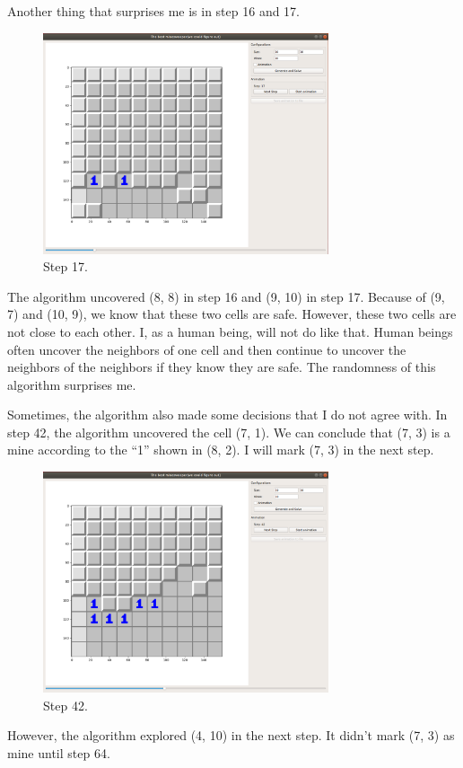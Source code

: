 \documentclass[letter]{article}
\begin{document}
\begin{enumerate}
	Another thing that surprises me is in step 16 and 17.
	
	\begin{figure}[H]
		\centering
		\includegraphics[width=0.75\textwidth]{../pics/4.png}
		\caption{\label{fig:4} Step 17.}
	\end{figure}
	The algorithm uncovered (8, 8) in step 16 and (9, 10) in step 17. Because of (9, 7) and (10, 9), we know that these two cells are safe. However, these two cells are not close to each other. I, as a human being, will not do like that. Human beings often uncover the neighbors of one cell and then continue to uncover the neighbors of the neighbors if they know they are safe. The randomness of this algorithm surprises me.
	
	
	Sometimes, the algorithm also made some decisions that I do not agree with. In step 42, the algorithm uncovered the cell (7, 1). We can conclude that (7, 3) is a mine according to the ``1'' shown in (8, 2). I will mark (7, 3) in the next step.
	
	\begin{figure}[H]
		\centering
		\includegraphics[width=0.75\textwidth]{../pics/5.png}
		\caption{\label{fig:5} Step 42.}
	\end{figure}
	However, the algorithm explored (4, 10) in the next step. It didn’t mark (7, 3) as mine until step 64.
	

\end{enumerate}
\end{document}
